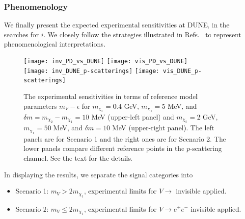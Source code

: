 


\subsubsection{Phenomenology}\label{Sec:Pheno}

We finally present the expected experimental sensitivities at %
DUNE, in the searches for $i$. 
We closely follow the strategies illustrated in Refs.~\cite{Giudice:2017zke, Chatterjee:2018mej, Kim:2018veo} to represent phenomenological interpretations. 

\begin{figure}[t]
\centering
\texttt{[image: inv\_PD\_vs\_DUNE]} 
\texttt{[image: vis\_PD\_vs\_DUNE]} \\
\vspace{0.3cm}
\texttt{[image: inv\_DUNE\_p-scatterings]}
\texttt{[image: vis\_DUNE\_p-scatterings]}
\caption[Experimental sensitivities for $m_{\chi_n}$ values in terms of $m_V - \epsilon$]{
The experimental sensitivities in terms of reference model parameters $m_V - \epsilon$ 
for $m_{\chi_0} = 0.4$ GeV, $m_{\chi_1} = 5$ MeV, and $\delta m = m_{\chi_2} - m_{\chi_1} = 10$ MeV (upper-left panel) and $m_{\chi_0} = 2$ GeV, $m_{\chi_1} = 50$ MeV, and $\delta m = 10$ MeV (upper-right panel).
The left panels are for Scenario 1 and the right ones are for Scenario 2.
The lower panels compare different reference points in the $p$-scattering channel.
See the text for the details.
\label{fig:darkphotonparameter} }
\end{figure}


In displaying the results, we separate the signal categories into %
\begin{itemize}
\item Scenario 1: $m_V > 2 m_{\chi_1}$, experimental limits for $V \to$ invisible  applied.
\item Scenario 2: $m_V \le 2 m_{\chi_1}$, experimental limits for $V \to e^+ e^-$ invisible  applied.
\end{itemize}

